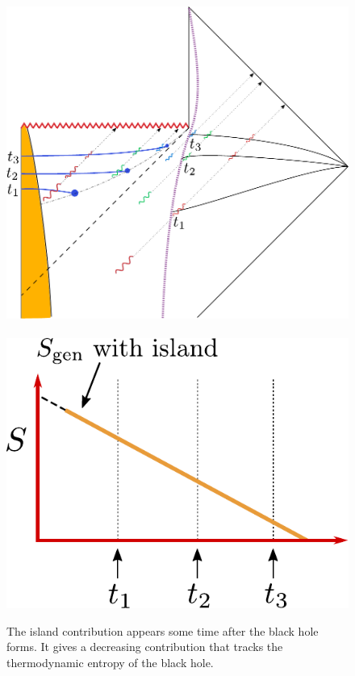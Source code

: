 \begin{figure}[htbp]
\begin{center}
\includegraphics[scale=0.4]{figures/radwithisland.pdf}
 \ \ \ \ \ \  \includegraphics[scale=0.6]{figures/radwithislandcurve.pdf}
\caption{The  island contribution appears some time after the black hole forms. It gives a decreasing contribution that tracks the thermodynamic entropy of the black hole.   }
\label{radwithisland}
\end{center}
\end{figure}

